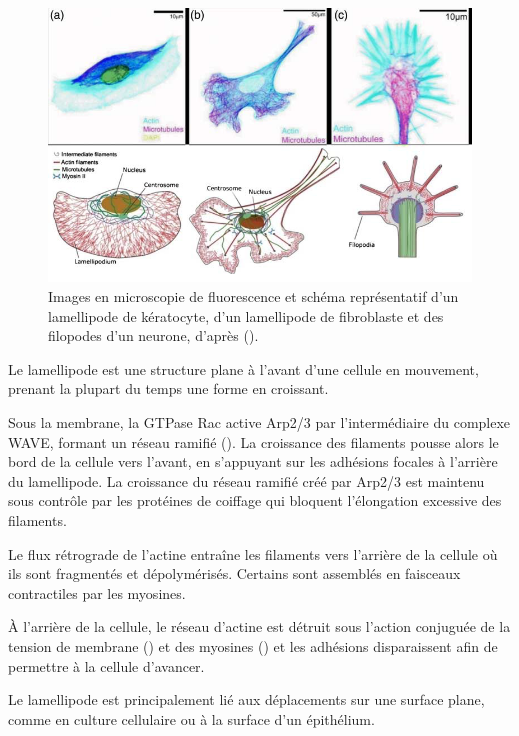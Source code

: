 \begin{figure}[h!]
\includegraphics[scale=0.5]{Figures/lamellipode_impress.png}
\caption{Images en microscopie de fluorescence et schéma représentatif d'un lamellipode de kératocyte, d'un lamellipode de fibroblaste et des filopodes d'un neurone, d'après (\cite{huber_emergent_2013}). } 
\end{figure}

Le lamellipode est une structure plane à l'avant d'une cellule en mouvement, prenant la plupart du temps une forme en croissant. 

Sous la membrane, la GTPase Rac active Arp2/3 par l'intermédiaire du complexe WAVE, formant un réseau ramifié (\cite{lebensohn_activation_2009}). 
La croissance des filaments pousse alors le bord de la cellule vers l'avant, en s'appuyant sur les adhésions focales à l'arrière du lamellipode. 
La croissance du réseau ramifié créé par Arp2/3 est maintenu sous contrôle par les protéines de coiffage qui bloquent l'élongation excessive des filaments. 

Le flux rétrograde de l'actine entraîne les filaments vers l'arrière de la cellule où ils sont fragmentés et dépolymérisés. 
Certains sont assemblés en faisceaux contractiles par les myosines. 

À l'arrière de la cellule, le réseau d'actine est détruit sous l'action conjuguée de la tension de membrane (\cite{raucher_cell_2000}) et des myosines (\cite{wilson_myosin_2010}) et les adhésions disparaissent afin de permettre à la cellule d'avancer.

Le lamellipode est principalement lié aux déplacements sur une surface plane, comme en culture cellulaire ou à la surface d'un épithélium. 




